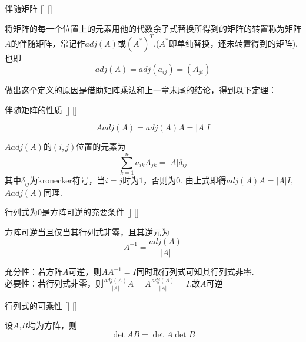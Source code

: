 \documentclass[UTF8]{ctexart}
\begin{document}
    \begin{dfn}
			[]
			{伴随矩阵}
			[]
			[]

        将矩阵的每一个位置上的元素用他的代数余子式替换所得到的矩阵的转置称为矩阵$A$的伴随矩阵，常记作$adj(A)$或$(A^{*})^{T}$,($A^{*}$即单纯替换，还未转置得到的矩阵),也即\[
        adj(A)=adj(a_{ij})=(A_{ji})
        \]
    \end{dfn}
    做出这个定义的原因是借助矩阵乘法和上一章末尾的结论，得到以下定理：
    \begin{thm}
			[]
			{伴随矩阵的性质}
			[]
			[]

        \[A adj(A)=adj(A)A=|A|I\]
    \end{thm}
    \begin{prf}
    $Aadj(A)$的$(i,j)$位置的元素为\[
    \sum_{k=1}^{n}a_{ik}A_{jk}=|A|\delta_{ij}
    \]
    其中$\delta_{ij}$为kronecker符号，当$i=j$时为$1$，否则为$0$. 由上式即得$adj(A)A=|A|I$, $Aadj(A)$同理.
    \end{prf}
    \begin{thm}
			[]
			{行列式为0是方阵可逆的充要条件}
			[]
			[]

        方阵可逆当且仅当其行列式非零，且其逆元为\[
        A^{-1}=\frac{adj(A)}{|A|}
        \]
    \end{thm}
    \begin{prf}
        充分性：若方阵$A$可逆，则$AA^{-1}=I$同时取行列式可知其行列式非零.\\
        必要性：若行列式非零，则$\frac{adj(A)}{|A|}A=A\frac{adj(A)}{|A|}=I$,故$A$可逆
        
    \end{prf}
    \begin{thm}
			[]
			{行列式的可乘性}
			[]
			[]

        设$A$,$B$均为方阵，则
        \[\det AB=\det A\det B\]
    \end{thm}
\end{document}

